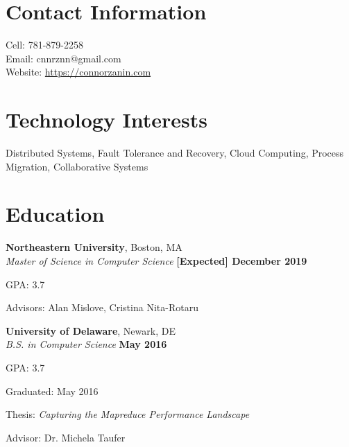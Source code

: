\documentclass[margin,line]{resume}
\newif\ifReferences
\newif\ifOnline
\begin{document}
\Referencesfalse
\Onlinefalse


\begin{resume}


\section{\mysidestyle Contact Information}
\ifOnline
	Email: cnnrznn@gmail.com	 							\hfill Boston, MA\\
\else
   	\mbox{} \hfill Cell: 781-879-2258\\
   	\mbox{} \hfill Email: cnnrznn@gmail.com\\
    \mbox{} \hfill Website: \url{https://connorzanin.com}\\
\fi
   




\section{\mysidestyle Technology Interests}
Distributed Systems, Fault Tolerance and Recovery, Cloud Computing, Process Migration, Collaborative Systems


\section{\mysidestyle Education}
\textbf{Northeastern University}, Boston, MA \vspace{1mm}\\%
\textsl{Master of Science in Computer Science} \hfill \textbf{[Expected] December 2019}
\vspace{-3mm}\\\vspace{-1mm}%
\begin{list2}
	\item GPA: 3.7
	\item Advisors: Alan Mislove, Cristina Nita-Rotaru
\end{list2}

\textbf{University of Delaware}, Newark, DE \vspace{1mm}\\%
\textsl{B.S. in Computer Science} \hfill \textbf{May 2016}\vspace{-3mm}\\\vspace{-1mm}%
\begin{list2}
	\item GPA: 3.7
    \item Graduated: May 2016
    \item Thesis: \textsl{Capturing the Mapreduce Performance Landscape}
    \item Advisor:  Dr. Michela Taufer
\end{list2}\vspace{-1.5mm}    



\end{resume}
\end{document}
